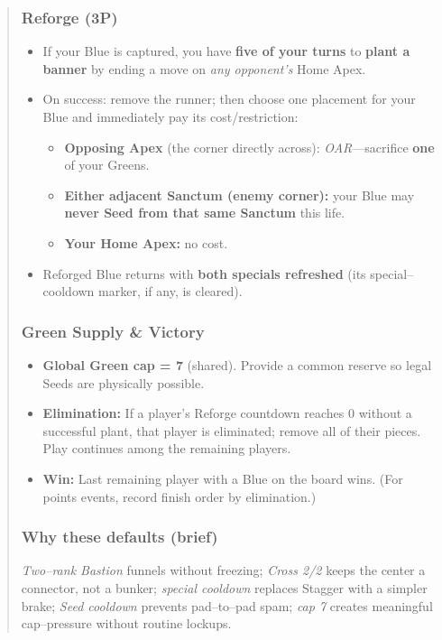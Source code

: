 \documentclass[11pt]{article}
\begin{document}
\begin{quote}
\subsubsection*{Reforge (3P)}
\begin{itemize}[leftmargin=1.3em,itemsep=0.25em]
  \item If your Blue is captured, you have \textbf{five of your turns} to \textbf{plant a banner} by ending a move on \emph{any opponent’s} Home Apex.
  \item On success: remove the runner; then choose one placement for your Blue and immediately pay its cost/restriction:
  \begin{itemize}[leftmargin=1.3em,itemsep=0.1em]
    \item \textbf{Opposing Apex} (the corner directly across): \textit{OAR}—sacrifice \textbf{one} of your Greens.
    \item \textbf{Either adjacent Sanctum (enemy corner):} your Blue may \textbf{never Seed from that same Sanctum} this life.
    \item \textbf{Your Home Apex:} no cost.
  \end{itemize}
  \item Reforged Blue returns with \textbf{both specials refreshed} (its special–cooldown marker, if any, is cleared).
\end{itemize}

\subsubsection*{Green Supply \& Victory}
\begin{itemize}[leftmargin=1.3em,itemsep=0.25em]
  \item \textbf{Global Green cap = 7} (shared). Provide a common reserve so legal Seeds are physically possible.
  \item \textbf{Elimination:} If a player’s Reforge countdown reaches 0 without a successful plant, that player is eliminated; remove all of their pieces. Play continues among the remaining players.
  \item \textbf{Win:} Last remaining player with a Blue on the board wins. (For points events, record finish order by elimination.)
\end{itemize}

\subsubsection*{Why these defaults (brief)}
\noindent \emph{Two–rank Bastion} funnels without freezing; \emph{Cross 2/2} keeps the center a connector, not a bunker; \emph{special cooldown} replaces Stagger with a simpler brake; \emph{Seed cooldown} prevents pad–to–pad spam; \emph{cap 7} creates meaningful cap–pressure without routine lockups.


\end{quote}
\end{document}
